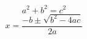 \documentclass{article}
\begin{document}
$$a^2 + b^2 = c^2$$
$$x=\frac{-b \pm \sqrt{b^2 - 4ac}}{2a}$$
\end{document}
